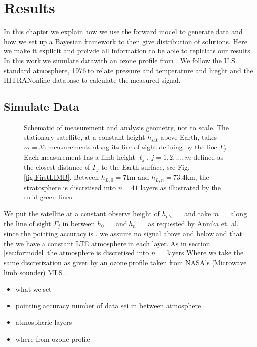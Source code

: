 \chapter{Results}
\label{ch:res}

In this chapter we explain how we use the forward model to generate data and how we set up a Bayesian framework to then give distribution of solutions.
Here we make it explicit and proivde all information to be able to replciate our results.
In this work we simulate datawith an ozone profile from \cite{}.
We follow the U.S. standard atmosphere, 1976 \cite{} to relate pressure and temperature and hieght and the HITRANonline \cite{} database to calculate the measured signal.\expandafter\string\the\font 

\section{Simulate Data}
\begin{figure}[ht!]
	\centering
	
	\label{fig:LIMB}
	\caption[Schematic of measurement and analysis geometry.]{Schematic of measurement and analysis geometry, not to scale.
		The stationary satellite, at a constant height $h_\text{sat}$ above Earth, takes $m = 36$ measurements along its line-of-sight defining by the line $\Gamma_j$.
		Each measurement has a limb height $\ell_j$, $j=1,2,\dots,m$ defined as the closest distance of $\Gamma_j$ to the Earth surface, see Fig. \ref{fig:FirstLIMB}.
		Between $h_{L,0} = 7$km and $h_{L,n} = 73.4$km, the stratosphere is discretised into $n =41$ layers as illustrated by the solid green lines.}
\end{figure}
We put the satellite at a constant observe height of $h_{obs} =$ and take $m = $ along the line of sight $\Gamma_j$ in between $h_0= $ and $h_n = $ as requested by Annika et. al. since the pointing accuracy is .
we assume no signal above and below and that the we have a constant LTE atmosphere in each layer.
As in section \ref{sec:formodel} the atmosphere is discretised into $n = $ layers
Where we take the same discretization as given by an ozone profile taken from NASA's (Microwave limb sounder) MLS \cite{}.

\begin{itemize}
	\item what we set
	\item pointing accuracy number of data set in between atmosphere
	\item atmospheric layers
	\item where from ozone profile
\end{itemize}


